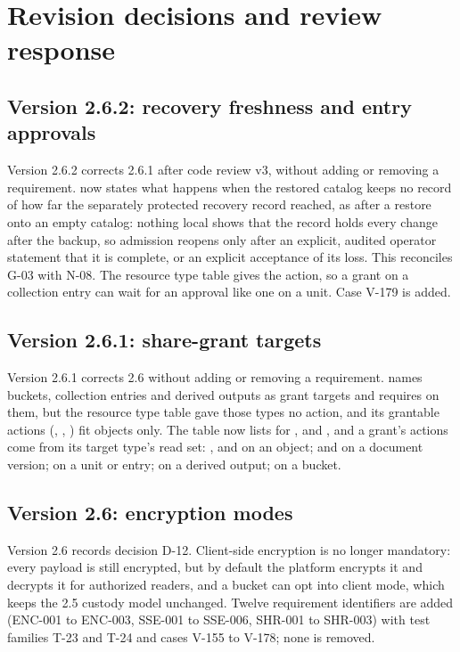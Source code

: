 \section{Revision decisions and review response}\label{app:review}
\subsection{Version 2.6.2: recovery freshness and entry approvals}
Version 2.6.2 corrects 2.6.1 after code review v3, without adding or removing a requirement.  now states what happens when the restored catalog keeps no record of how far the separately protected recovery record reached, as after a restore onto an empty catalog: nothing local shows that the record holds every change after the backup, so admission reopens only after an explicit, audited operator statement that it is complete, or an explicit acceptance of its loss. This reconciles G-03 with N-08. The resource type table gives  the  action, so a grant on a collection entry can wait for an approval like one on a unit. Case V-179 is added.

\subsection{Version 2.6.1: share-grant targets}
Version 2.6.1 corrects 2.6 without adding or removing a requirement.  names buckets, collection entries and derived outputs as grant targets and requires  on them, but the resource type table gave those types no  action, and its grantable actions (, , ) fit objects only. The table now lists  for ,  and , and a grant's actions come from its target type's read set: ,  and  on an object;  and  on a document version;  on a unit or entry;  on a derived output;  on a bucket.

\subsection{Version 2.6: encryption modes}
Version 2.6 records decision D-12. Client-side encryption is no longer mandatory: every payload is still encrypted, but by default the platform encrypts it and decrypts it for authorized readers, and a bucket can opt into client mode, which keeps the 2.5 custody model unchanged. Twelve requirement identifiers are added (ENC-001 to ENC-003, SSE-001 to SSE-006, SHR-001 to SHR-003) with test families T-23 and T-24 and cases V-155 to V-178; none is removed.

